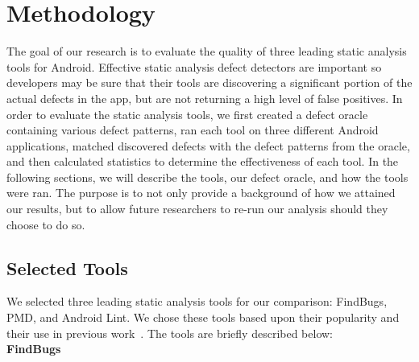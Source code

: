 \documentclass{sig-alternate}
\newcommand{\todo}[1]{\textcolor{cyan}{\textbf{[#1]}}}
\begin{document}









\section{Methodology}
\label{sec:Methodology}


The goal of our research is to evaluate the quality of three leading static analysis tools for Android. Effective static analysis defect detectors are important so developers may be sure that their tools are discovering a significant portion of the actual defects in the app, but are not returning a high level of false positives. In order to evaluate the static analysis tools, we first created a defect oracle containing various defect patterns, ran each tool on three different Android applications, matched discovered defects with the defect patterns from the oracle, and then calculated statistics to determine the effectiveness of each tool. In the following sections, we will describe the tools, our defect oracle, and how the tools were ran. The purpose is to not only provide a background of how we attained our results, but to allow future researchers to re-run our analysis should they choose to do so.

\subsection{Selected Tools}
We selected three leading static analysis tools for our comparison: FindBugs, PMD, and Android Lint. We chose these tools based upon their popularity and their use in previous work~\cite{7006337, Thung:2012:EWD:2351676.2351685}. The tools are briefly described below: \\


\noindent
\textbf{FindBugs}
\end{document}

